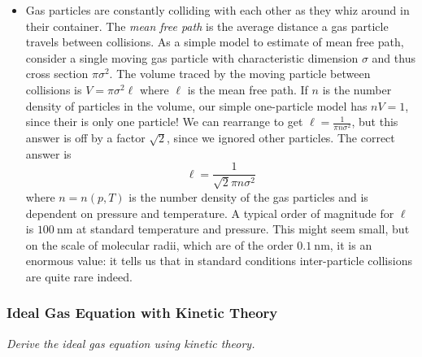 \documentclass[11pt, a4paper]{article}
\begin{document}
\begin{itemize}
	\item Gas particles are constantly colliding with each other as they whiz around in their container. The \textit{mean free path} is the average distance a gas particle travels between collisions. As a simple model to estimate of mean free path, consider a single moving gas particle with characteristic dimension $ \sigma $ and thus cross section $ \pi \sigma^{2} $. The volume traced by the moving particle between collisions is $ V = \pi \sigma^{2} \ell $ where $ \ell $ is the mean free path. If $ n $ is the number density of particles in the volume, our simple one-particle model has $ n V = 1 $, since their is only one particle! We can rearrange to get $ \ell = \frac{1}{\pi n \sigma^{2}} $, but this answer is off by a factor $ \sqrt{2} $, since we ignored other particles. The correct answer is
	\begin{equation*}
		\ell = \frac{1}{\sqrt{2}\pi n \sigma^{2}} 
	\end{equation*}
	where $ n = n(p, T) $ is the number density of the gas particles and is dependent on pressure and temperature. A typical order of magnitude for $ \ell $ is $ \SI{100}{\nano \meter} $ at standard temperature and pressure. This might seem small, but on the scale of molecular radii, which are of the order $ \SI{0.1}{\nano \meter} $, it is an enormous value: it tells us that in standard conditions inter-particle collisions are quite rare indeed.

\end{itemize}

\subsubsection{Ideal Gas Equation with Kinetic Theory}
\textit{Derive the ideal gas equation using kinetic theory.}
\end{document}
